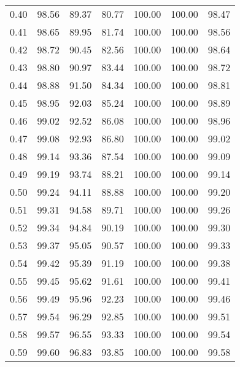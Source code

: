\begin{tabular}{|c|c|c|c|c|c|c|}
      0.40 &     98.56 &     89.37 &      80.77 &  100.00 &     100.00 &         98.47 \\
      0.41 &     98.65 &     89.95 &      81.74 &  100.00 &     100.00 &         98.56 \\
      0.42 &     98.72 &     90.45 &      82.56 &  100.00 &     100.00 &         98.64 \\
      0.43 &     98.80 &     90.97 &      83.44 &  100.00 &     100.00 &         98.72 \\
      0.44 &     98.88 &     91.50 &      84.34 &  100.00 &     100.00 &         98.81 \\
      0.45 &     98.95 &     92.03 &      85.24 &  100.00 &     100.00 &         98.89 \\
      0.46 &     99.02 &     92.52 &      86.08 &  100.00 &     100.00 &         98.96 \\
      0.47 &     99.08 &     92.93 &      86.80 &  100.00 &     100.00 &         99.02 \\
      0.48 &     99.14 &     93.36 &      87.54 &  100.00 &     100.00 &         99.09 \\
      0.49 &     99.19 &     93.74 &      88.21 &  100.00 &     100.00 &         99.14 \\
      0.50 &     99.24 &     94.11 &      88.88 &  100.00 &     100.00 &         99.20 \\
      0.51 &     99.31 &     94.58 &      89.71 &  100.00 &     100.00 &         99.26 \\
      0.52 &     99.34 &     94.84 &      90.19 &  100.00 &     100.00 &         99.30 \\
      0.53 &     99.37 &     95.05 &      90.57 &  100.00 &     100.00 &         99.33 \\
      0.54 &     99.42 &     95.39 &      91.19 &  100.00 &     100.00 &         99.38 \\
      0.55 &     99.45 &     95.62 &      91.61 &  100.00 &     100.00 &         99.41 \\
      0.56 &     99.49 &     95.96 &      92.23 &  100.00 &     100.00 &         99.46 \\
      0.57 &     99.54 &     96.29 &      92.85 &  100.00 &     100.00 &         99.51 \\
      0.58 &     99.57 &     96.55 &      93.33 &  100.00 &     100.00 &         99.54 \\
      0.59 &     99.60 &     96.83 &      93.85 &  100.00 &     100.00 &         99.58 \\

\end{tabular}
